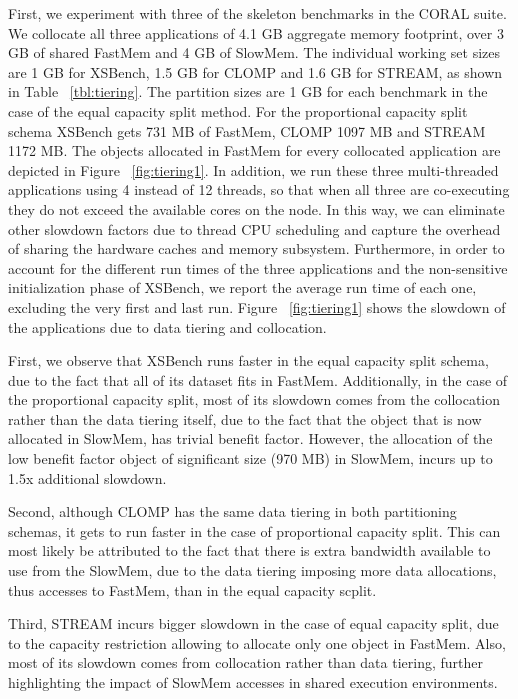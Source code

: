 \noindent First, we experiment with three of the skeleton benchmarks in the CORAL suite. We collocate all three 
applications of 4.1 GB aggregate memory footprint, over 3 GB of shared FastMem and 4 GB of SlowMem.
The individual working set sizes are 1 GB for XSBench, 1.5 GB for CLOMP and 1.6 GB for STREAM, as shown in Table 
~\ref{tbl:tiering}. The partition sizes are 1 GB for each benchmark in the case of the equal capacity split method. 
For the proportional capacity split schema XSBench gets 731 MB of FastMem, CLOMP 1097 MB and STREAM 1172 MB. The objects allocated in FastMem for every collocated application are depicted in Figure ~\ref{fig:tiering1}. 
In addition, we run these three multi-threaded applications using 4 instead of 12 threads, so that when all three are 
co-executing they do not exceed the available cores on the node. In this way, we can eliminate other 
slowdown factors due to thread CPU scheduling and capture the overhead of sharing the hardware caches and 
memory subsystem. Furthermore, in order to account for the different run times of the three applications and 
the non-sensitive initialization phase of XSBench, we report the average run time of each one, excluding the very first and last run. Figure ~\ref{fig:tiering1} shows the slowdown of the applications due to data tiering and collocation.

First, we observe that XSBench runs faster in the equal capacity split schema, due to the fact that all of its dataset fits in FastMem. Additionally, in the case of the proportional capacity split, most of its slowdown comes from the collocation rather than the data tiering itself, due to the fact that the object that is now allocated in SlowMem, has trivial benefit factor. However, the allocation of the low benefit factor object of significant size (970 MB) in SlowMem, incurs up to 1.5x additional slowdown.

Second, although CLOMP has the same data tiering in both partitioning schemas, it gets to run faster in the case of proportional capacity split. This can most likely be	 attributed to the fact that there is extra bandwidth available to use from the SlowMem, due to the data tiering imposing more data allocations, thus accesses to FastMem, than in the equal capacity scplit.

Third, STREAM incurs bigger slowdown in the case of equal capacity split, due to the capacity restriction allowing to allocate only one object in FastMem. Also, most of its slowdown comes from collocation rather than data tiering, further highlighting the impact of SlowMem accesses in shared execution environments.

